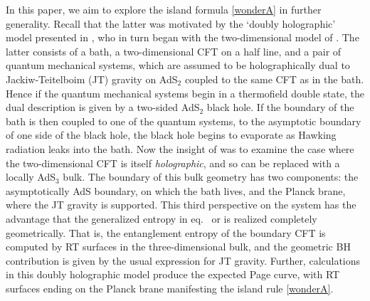 In this paper, we aim to explore the island formula \eqref{wonderA} in further generality. Recall that the latter was motivated by the `doubly holographic' model presented in \cite{Almheiri:2019hni}, who in turn began with the two-dimensional model of \cite{Almheiri:2019psf}. The latter consists of a bath, \ie a two-dimensional CFT on a half line, and a pair of quantum mechanical systems, which are assumed to be holographically dual to Jackiw-Teitelboim (JT) gravity on AdS$_2$ coupled to the same CFT as in the bath. Hence if the quantum mechanical systems begin in a thermofield double state, the dual description is given by a two-sided AdS$_2$ black hole. If the boundary of the bath is then coupled to one of the quantum  systems, \ie to the asymptotic boundary of one side of the black hole, the black hole begins to evaporate as Hawking radiation leaks into the bath. Now the insight of \cite{Almheiri:2019hni} was to examine the case where the two-dimensional CFT is itself \textit{holographic}, and so can be replaced with a locally AdS$_3$ bulk. The boundary of this bulk geometry has two components: the asymptotically AdS boundary, on which the bath lives, and the Planck brane, where the JT gravity is supported. This third perspective on the system has the advantage that the generalized entropy in eq.~ or  is realized completely geometrically. That is, the entanglement entropy of the boundary CFT is computed by RT surfaces in the three-dimensional bulk, and the geometric BH contribution is given by the usual expression for JT gravity. Further, calculations in this doubly holographic model produce the expected Page curve, with RT surfaces ending on the Planck brane manifesting the island rule \eqref{wonderA}. 

